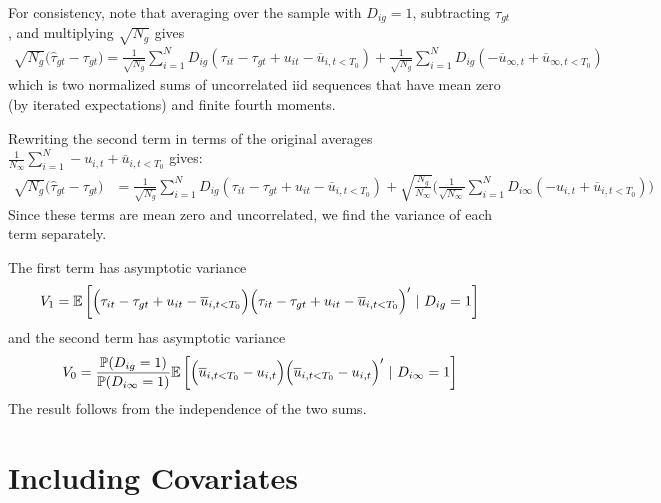 \documentclass[12pt]{article}
\begin{document}
For consistency, note that averaging over the sample with $D_{ig} = 1$, subtracting $\tau_{gt}$, and multiplying $\sqrt{N_{g}}$ gives
\begin{align}
    \sqrt{N_{g}} \big( \widehat{\tau}_{gt} - \tau_{gt} \big) 
    = \frac{1}{\sqrt{N_{g}}}\sum_{i=1}^N D_{ig} (\tau_{it} - \tau_{gt} + u_{it} - \overline{u}_{i,t < T_0})
    + \frac{1}{\sqrt{N_{g}}}\sum_{i = 1}^N D_{ig} (- \overline{u}_{\infty,t} + \overline{u}_{\infty,t < T_0}) 
\end{align}
which is two normalized sums of uncorrelated iid sequences that have mean zero (by iterated expectations) and finite fourth moments. %

Rewriting the second term in terms of the original averages $\frac{1}{N_\infty} \sum_{i=1}^N - u_{i,t} + \overline{u}_{i,t < T_0}$ gives:
\begin{align}
    \sqrt{N_{g}} \big( \widehat{\tau}_{gt} - \tau_{gt} \big) 
    &= \frac{1}{\sqrt{N_{g}}}\sum_{i=1}^N D_{ig} (\tau_{it} - \tau_{gt} + u_{it} - \overline{u}_{i,t < T_0})
    + \sqrt{\frac{N_g}{N_\infty}} \bigg ( \frac{1}{\sqrt{N_\infty}} \sum_{i = 1}^N D_{i\infty} (- u_{i,t} + \overline{u}_{i,t < T_0} ) \bigg)
\end{align}
Since these terms are mean zero and uncorrelated, we find the variance of each term separately. 

The first term has asymptotic variance 
\begin{equation}
V_1 = \mathbb{E}\left[\Big( \tau_{it} - \tau_{gt} + u_{it} - \overline{u}_{i,t < T_0} \Big) \Big( \tau_{it} - \tau_{gt} + u_{it} - \overline{u}_{i,t < T_0} \Big)' \ \vert \ D_{ig} = 1\right]
\end{equation}
and the second term has asymptotic variance
\begin{equation}
V_0 = \frac{\mathbb{P}(D_{ig} = 1)}{\mathbb{P}(D_{i\infty} = 1)} \mathbb{E}\left[ \Big( \overline{u}_{i,t < T_0} - u_{i,t} \Big) \Big( \overline{u}_{i,t < T_0} - u_{i,t} \Big)'  \ \vert \ D_{i\infty} = 1\right]
\end{equation}
The result follows from the independence of the two sums.




\section{Including Covariates}
\end{document}
